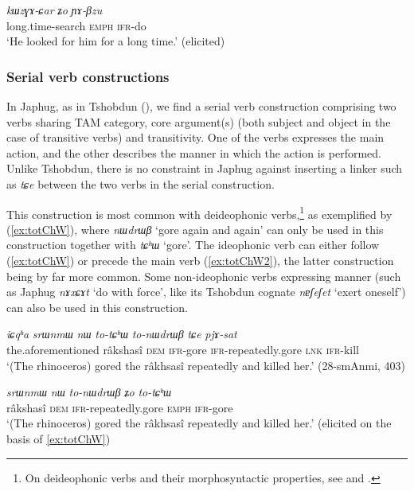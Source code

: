 \documentclass[oneside,a4paper,11pt]{article}
\newcommand{\ipa}[1]{\textit{\phon#1}}
\newcommand{\jpg}[2]{\ipa{#1} `#2'}
\begin{document}
\begin{exe}
\ex \label{ex:kWzGa2}
\gll 
\ipa{kɯzɣɤ-ɕar} 	\ipa{ʑo} 	\ipa{ɲɤ-βzu} \\
long.time-search \textsc{emph} \textsc{ifr}-do \\
\glt `He looked for him for a long time.' (elicited)
\end{exe}

\subsubsection{Serial verb constructions} \label{sec:serial}
In Japhug, as in Tshobdun (\citealt[490-1]{sun12complementation}), we find a serial verb construction comprising two verbs sharing TAM category, core argument(s) (both subject and object in the case of transitive verbs) and transitivity. One of the verbs expresses the main action, and the other describes the manner in which the action is performed. Unlike Tshobdun, there is no constraint in Japhug against inserting a linker such as \ipa{tɕe} between the two verbs in the serial construction.

This construction is most common with deideophonic verbs,\footnote{On deideophonic verbs and their morphosyntactic properties, see \citet{jackson04zhuangmaoci} and \citet{japhug14ideophones}.} as exemplified by (\ref{ex:totChW}), where \jpg{nɯdrɯβ}{gore again and again} can only be used in this construction together with \jpg{tɕʰɯ}{gore}. The ideophonic verb can either follow (\ref{ex:totChW}) or precede  the main verb (\ref{ex:totChW2}), the latter construction being by far more common. Some non-ideophonic verbs expressing manner (such as Japhug  \jpg{nɤxɕɤt}{do with force}, like its Tshobdun cognate \jpg{nɐʃeʃet}{exert oneself}) can also be used in this construction.

\begin{exe}
\ex \label{ex:totChW}
\gll \ipa{iɕqʰa} 	\ipa{srɯnmɯ} 	\ipa{nɯ} 	\ipa{to-tɕʰɯ} 	\ipa{to-nɯdrɯβ}  \ipa{tɕe} 	\ipa{pjɤ-sat} \\
the.aforementioned râkshasî \textsc{dem} \textsc{ifr}-gore \textsc{ifr}-repeatedly.gore  \textsc{lnk} \textsc{ifr}-kill \\
\glt `(The rhinoceros) gored the râkhsasî repeatedly and killed her.' (28-smAnmi, 403)
\end{exe}

\begin{exe}
\ex \label{ex:totChW2}
\gll 	\ipa{srɯnmɯ} 	\ipa{nɯ} 	\ipa{to-nɯdrɯβ} 	\ipa{ʑo} 	 	\ipa{to-tɕʰɯ} \\
 râkshasî \textsc{dem}  \textsc{ifr}-repeatedly.gore  \textsc{emph}  \textsc{ifr}-gore \\
 \glt `(The rhinoceros) gored the râkhsasî repeatedly and killed her.' (elicited on the basis of \ref{ex:totChW})
\end{exe}	
\end{document}
